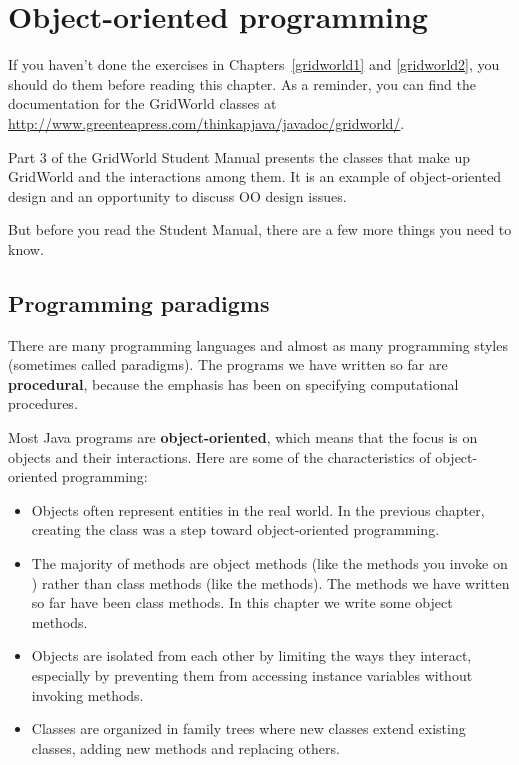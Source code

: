 \chapter{Object-oriented programming}

If you haven't done the exercises in Chapters~\ref{gridworld1} and \ref{gridworld2}, you should do them before reading this chapter.
As a reminder, you can find the documentation for the GridWorld classes at \url{http://www.greenteapress.com/thinkapjava/javadoc/gridworld/}.

Part 3 of the GridWorld Student Manual presents the classes that make up GridWorld and the interactions among them.
It is an example of object-oriented design and an opportunity to discuss OO design issues.

But before you read the Student Manual, there are a few more things you need to know.


\section{Programming paradigms}


There are many programming languages and almost as many programming styles (sometimes called paradigms).
The programs we have written so far are {\bf procedural}, because the emphasis has been on specifying computational procedures.

Most Java programs are {\bf object-oriented}, which means that the focus is on objects and their interactions.
Here are some of the characteristics of object-oriented programming:

\begin{itemize}

\item Objects often represent entities in the real world.
In the previous chapter, creating the  class was a step toward object-oriented programming.

\item The majority of methods are object methods (like the methods you invoke on ) rather than class methods (like the  methods).
The methods we have written so far have been class methods.
In this chapter we write some object methods.

\item Objects are isolated from each other by limiting the ways they interact, especially by preventing them from accessing  instance variables without invoking methods.

\item Classes are organized in family trees where new classes extend existing classes, adding new methods and replacing others.

\end{itemize}

